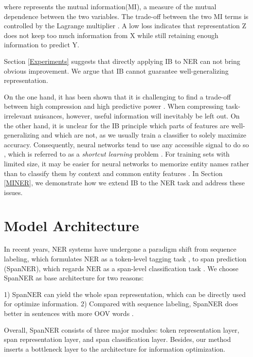 \documentclass[11pt]{article}
\begin{document}
where  represents the mutual information(MI), a measure of the mutual dependence between the two variables. The trade-off between the two MI terms is controlled by the Lagrange multiplier . A low loss indicates that representation Z does not keep too much information from X while still retaining enough information to predict Y.

Section \ref{Experiments} suggests that directly applying IB to NER can not bring obvious improvement. We argue that IB  cannot guarantee well-generalizing representation.

On the one hand, it has been shown that it is challenging to find a trade-off between high compression and high predictive power \cite{tishby2000information,wang2019deep,piran2020dual}. When compressing task-irrelevant nuisances, however, useful information will inevitably be left out. On the other hand, it is unclear for the IB principle which parts of features are well-generalizing and which are not, as we usually train a classifier to solely maximize accuracy. Consequently, neural networks tend to use any accessible signal to do so \cite{ilyas2019adversarial}, which is referred to as a \textit{shortcut learning} problem \cite{geirhos2020shortcut}. For training sets with limited size, it may be easier for neural networks to memorize entity names rather than to classify them by context and common entity features \cite{agarwal2021interpretability}. In Section \ref{MINER}, we demonstrate how we extend IB to the NER task and address these issues.


\section{Model Architecture}
In recent years, NER systems have undergone a paradigm shift from sequence labeling, which formulates NER as a token-level tagging task \cite{chiu2016named,akbik2018contextual,yan2019tener}, to span prediction (SpanNER), which regards NER as a span-level classification task \cite{mengge-etal-2020-coarse,yamada-etal-2020-luke,fu-etal-2021-spanner}. We choose SpanNER as base architecture for two reasons:

1) SpanNER can yield the whole span representation, which can be directly used for optimize information. 
2) Compared with sequence labeling, SpanNER does better in sentences with more OOV words \cite{fu-etal-2021-spanner}. 

Overall, SpanNER consists of three major modules: token representation layer, span representation layer, and span classification layer. Besides, our method inserts a bottleneck layer to the architecture for information optimization. 
\end{document}
